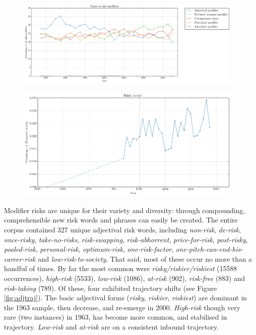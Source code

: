           \noindent
          \begin{figure}[htb!]
          \centering
          \begin{minipage}{.567\textwidth}
            \centering
            \includegraphics[width=0.98\textwidth]{../images/types-of-risk-modifiers.png}
         \label{fig:riskmod_types}
          \end{minipage}%
          \begin{minipage}{.433\textwidth}
            \centering
              \includegraphics[width=0.98\textwidth]{../images/risk-factor.png}
                \label{fig:riskfactor}
           \end{minipage}
          \end{figure}


			Modifier risks are unique for their variety and diversity: through compounding, comprehensible new risk words and phrases can easily be created. The entire corpus contained 327 unique adjectival risk words, including \emph{non-risk}, \emph{de-risk}, \emph{once-risky}, \emph{take-no-risks}, \emph{risk-swapping}, \emph{risk-abhorrent}, \emph{price-for-risk}, \emph{post-risky}, \emph{pooled-risk}, \emph{personal-risk}, \emph{optimum-risk}, \emph{one-risk-factor}, \emph{one-pitch-can-end-his-career-risk} and \emph{low-risk-to-society}. That said, most of these occur no more than a handful of times. By far the most common were \emph{risky\slash riskier\slash riskiest} (15588 occurrences), \emph{high-risk} (5533), \emph{low-risk} (1086), \emph{at-risk} (902), \emph{risk-free} (883) and \emph{risk-taking} (789). Of these, four exhibited trajectory shifts (see Figure \ref{fig:adjtraj}). The basic adjectival forms (\emph{risky}, \emph{riskier}, \emph{riskiest}) are dominant in the 1963 sample, then decrease, and re-emerge in 2000. \emph{High-risk} though very rare (two instances) in 1963, has become more common, and stabilised in trajectory. \emph{Low-risk} and \emph{at-risk} are on a consistent inbound trajectory.

